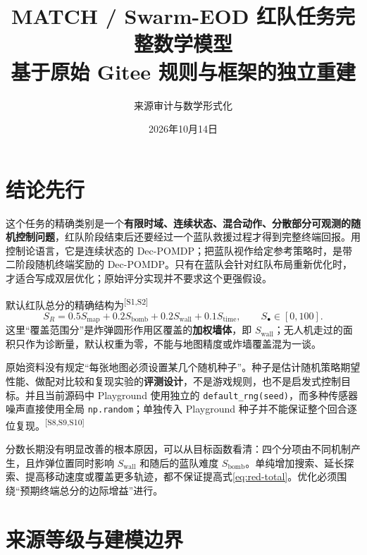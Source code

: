 \documentclass[UTF8,11pt]{ctexart}
\title{MATCH / Swarm-EOD 红队任务完整数学模型\\
\large 基于原始 Gitee 规则与框架的独立重建}
\author{来源审计与数学形式化}
\date{2026年10月14日}
\newcommand{\src}[1]{\textsuperscript{\textcolor{blue!65!black}{[#1]}}}
\begin{document}
\maketitle

\begin{center}
\end{center}

\section{结论先行}

这个任务的精确类别是一个\textbf{有限时域、连续状态、混合动作、分散部分可观测的随机控制问题}，红队阶段结束后还要经过一个蓝队救援过程才得到完整终端回报。用控制论语言，它是连续状态的 Dec-POMDP；把蓝队视作给定参考策略时，是带二阶段随机终端奖励的 Dec-POMDP。只有在蓝队会针对红队布局重新优化时，才适合写成双层优化；原始评分实现并不要求这个更强假设。

默认红队总分的精确结构为\src{S1,S2}
\begin{equation}
S_R=0.5S_{\mathrm{map}}+0.2S_{\mathrm{bomb}}+0.2S_{\mathrm{wall}}+0.1S_{\mathrm{time}},
\qquad S_\bullet\in[0,100].
\label{eq:red-total}
\end{equation}
这里“覆盖范围分”是炸弹圆形作用区覆盖的\textbf{加权墙体}，即 $S_{\mathrm{wall}}$；无人机走过的面积只作为诊断量，默认权重为零，不能与地图精度或炸墙覆盖混为一谈。

原始资料没有规定“每张地图必须设置某几个随机种子”。种子是估计随机策略期望性能、做配对比较和复现实验的\textbf{评测设计}，不是游戏规则，也不是启发式控制目标。并且当前源码中 Playground 使用独立的 \texttt{default\_rng(seed)}，而多种传感器噪声直接使用全局 \texttt{np.random}；单独传入 Playground 种子并不能保证整个回合逐位复现。\src{S8,S9,S10}

分数长期没有明显改善的根本原因，可以从目标函数看清：四个分项由不同机制产生，且炸弹位置同时影响 $S_{\mathrm{wall}}$ 和随后的蓝队难度 $S_{\mathrm{bomb}}$。单纯增加搜索、延长探索、提高移动速度或覆盖更多轨迹，都不保证提高式\eqref{eq:red-total}。优化必须围绕“预期终端总分的边际增益”进行。

\section{来源等级与建模边界}
\end{document}
